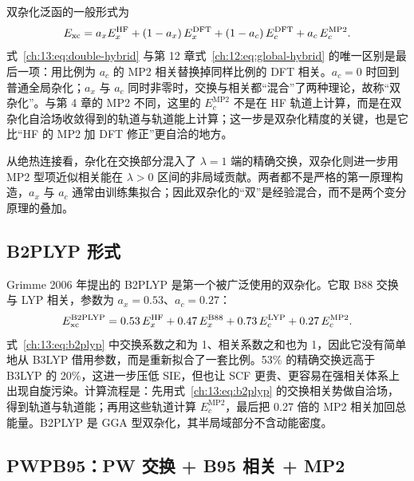 双杂化泛函的一般形式为
\begin{equation}
E_{\mathrm{xc}}
= a_x E_x^{\mathrm{HF}}
+ (1-a_x)\,E_x^{\mathrm{DFT}}
+ (1-a_c)\,E_c^{\mathrm{DFT}}
+ a_c\,E_c^{\mathrm{MP2}}.
\label{ch:13:eq:double-hybrid}
\end{equation}
式~\eqref{ch:13:eq:double-hybrid} 与第 12 章式~\eqref{ch:12:eq:global-hybrid} 的唯一区别是最后一项：用比例为 $a_c$ 的 MP2 相关替换掉同样比例的 DFT 相关。$a_c=0$ 时回到普通全局杂化；$a_x$ 与 $a_c$ 同时非零时，交换与相关都“混合”了两种理论，故称“双杂化”。与第 4 章的 MP2 不同，这里的 $E_c^{\mathrm{MP2}}$ 不是在 HF 轨道上计算，而是在双杂化自洽场收敛得到的轨道与轨道能上计算；这一步是双杂化精度的关键，也是它比“HF 的 MP2 加 DFT 修正”更自洽的地方。

从绝热连接看，杂化在交换部分混入了 $\lambda=1$ 端的精确交换，双杂化则进一步用 MP2 型项近似相关能在 $\lambda>0$ 区间的非局域贡献。两者都不是严格的第一原理构造，$a_x$ 与 $a_c$ 通常由训练集拟合；因此双杂化的“双”是经验混合，而不是两个变分原理的叠加。

\subsection{B2PLYP 形式}
\label{ch:13:sec:b2plyp}

Grimme 2006 年提出的 B2PLYP 是第一个被广泛使用的双杂化\citep{grimme2006b2plyp}。它取 B88 交换与 LYP 相关，参数为 $a_x=0.53$、$a_c=0.27$：
\begin{equation}
E_{\mathrm{xc}}^{\mathrm{B2PLYP}}
= 0.53\,E_x^{\mathrm{HF}}
+ 0.47\,E_x^{\mathrm{B88}}
+ 0.73\,E_c^{\mathrm{LYP}}
+ 0.27\,E_c^{\mathrm{MP2}}.
\label{ch:13:eq:b2plyp}
\end{equation}
式~\eqref{ch:13:eq:b2plyp} 中交换系数之和为 1、相关系数之和也为 1，因此它没有简单地从 B3LYP 借用参数，而是重新拟合了一套比例。53\% 的精确交换远高于 B3LYP 的 20\%，这进一步压低 SIE，但也让 SCF 更贵、更容易在强相关体系上出现自旋污染。计算流程是：先用式~\eqref{ch:13:eq:b2plyp} 的交换相关势做自洽场，得到轨道与轨道能；再用这些轨道计算 $E_c^{\mathrm{MP2}}$，最后把 0.27 倍的 MP2 相关加回总能量。B2PLYP 是 GGA 型双杂化，其半局域部分不含动能密度。

\subsection{PWPB95：PW 交换 + B95 相关 + MP2}
\label{ch:13:sec:pwpb95}

